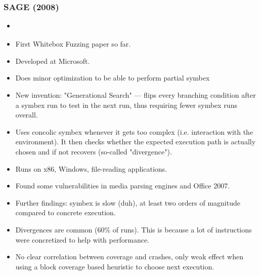 \documentclass[12pt]{article}
\begin{document}
\subsubsection{SAGE (2008)}
\begin{itemize}
    \item \cite{SAGE}
    \item First Whitebox Fuzzing paper so far.
    \item Developed at Microsoft.
    \item Does minor optimization to be able to perform partial symbex
    \item New invention: "Generational Search" — flips every branching condition after a symbex run to test in the next run, thus requiring fewer symbex runs overall.
    \item Uses concolic symbex whenever it gets too complex (i.e. interaction with the environment). It then checks whether the expected execution path is actually chosen and if not recovers (so-called "divergence").
    \item Runs on x86, Windows, file-reading applications.
    \item Found some vulnerabilities in media parsing engines and Office 2007.
    \item Further findings: symbex is slow (duh), at least two orders of magnitude compared to concrete execution.
    \item Divergences are common (60\% of runs). This is because a lot of instructions were concretized to help with performance.
    \item No clear correlation between coverage and crashes, only weak effect when using a block coverage based heuristic to choose next execution.
\end{itemize}
\end{document}
